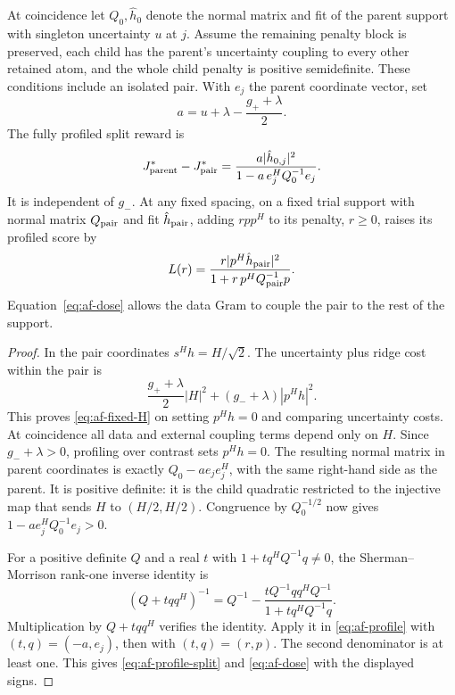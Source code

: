 At coincidence let $Q_0,\hat h_0$ denote the normal matrix and fit of
the parent support with singleton uncertainty $u$ at $j$. Assume the
remaining penalty block is preserved, each child has the parent's
uncertainty coupling to every other retained atom, and the whole child
penalty is positive semidefinite. These conditions include an isolated
pair. With $e_j$ the parent coordinate vector, set
\[
 a=u+\lambda-\frac{g_++\lambda}{2}.
\]
The fully profiled split reward is
\begin{equation}
 J_{\rm parent}^*-J_{\rm pair}^*
 =\frac{a|\hat h_{0,j}|^2}
        {1-a\,e_j^HQ_0^{-1}e_j}.                       \label{eq:af-profile-split}
\end{equation}
It is independent of $g_-$. At any fixed spacing, on a fixed trial
support with normal matrix $Q_{\rm pair}$ and fit $\hat h_{\rm pair}$,
adding $rpp^H$ to its penalty, $r\ge0$, raises its profiled score by
\begin{equation}
 L(r)=\frac{r|p^H\hat h_{\rm pair}|^2}
               {1+r\,p^HQ_{\rm pair}^{-1}p}.             \label{eq:af-dose}
\end{equation}
Equation~\eqref{eq:af-dose} allows the data Gram to couple the pair to
the rest of the support.

\begin{proof}
In the pair coordinates $s^Hh=H/\sqrt2$. The uncertainty plus ridge
cost within the pair is
\[
 \frac{g_++\lambda}{2}|H|^2+(g_-+\lambda)|p^Hh|^2.
\]
This proves \eqref{eq:af-fixed-H} on setting $p^Hh=0$ and comparing
uncertainty costs. At coincidence all data and external coupling terms
depend only on $H$. Since $g_-+\lambda>0$, profiling over contrast sets
$p^Hh=0$. The resulting normal matrix in parent coordinates is exactly
$Q_0-ae_je_j^H$, with the same right-hand side as the parent. It is
positive definite: it is the child quadratic restricted to the injective
map that sends $H$ to $(H/2,H/2)$. Congruence by $Q_0^{-1/2}$ now gives
$1-ae_j^HQ_0^{-1}e_j>0$.

For a positive definite $Q$ and a real $t$ with
$1+tq^HQ^{-1}q\ne0$, the Sherman--Morrison rank-one inverse identity is
\[
 (Q+tqq^H)^{-1}
 =Q^{-1}-\frac{tQ^{-1}qq^HQ^{-1}}{1+tq^HQ^{-1}q}.
\]
Multiplication by $Q+tqq^H$ verifies the identity. Apply it in
\eqref{eq:af-profile} with $(t,q)=(-a,e_j)$, then with $(t,q)=(r,p)$.
The second denominator is at least one. This gives
\eqref{eq:af-profile-split} and \eqref{eq:af-dose} with the displayed
signs.
\end{proof}

